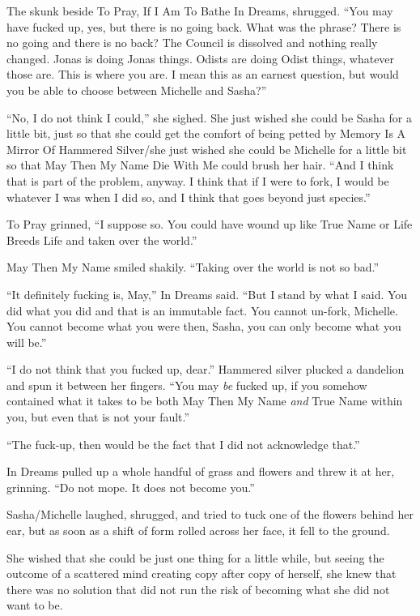 The skunk beside To Pray, If I Am To Bathe In Dreams, shrugged. ``You may have fucked up, yes, but there is no going back. What was the phrase? There is no going and there is no back? The Council is dissolved and nothing really changed. Jonas is doing Jonas things. Odists are doing Odist things, whatever those are. This is where you are. I mean this as an earnest question, but would you be able to choose between Michelle and Sasha?''

``No, I do not think I could,'' she sighed. She just wished she could be Sasha for a little bit, just so that she could get the comfort of being petted by Memory Is A Mirror Of Hammered Silver/she just wished she could be Michelle for a little bit so that May Then My Name Die With Me could brush her hair. ``And I think that is part of the problem, anyway. I think that if I were to fork, I would be whatever I was when I did so, and I think that goes beyond just species.''

To Pray grinned, ``I suppose so. You could have wound up like True Name or Life Breeds Life and taken over the world.''

May Then My Name smiled shakily. ``Taking over the world is not so bad.''

``It definitely fucking is, May,'' In Dreams said. ``But I stand by what I said. You did what you did and that is an immutable fact. You cannot un-fork, Michelle. You cannot become what you were then, Sasha, you can only become what you will be.''

``I do not think that you fucked up, dear.'' Hammered silver plucked a dandelion and spun it between her fingers. ``You may \emph{be} fucked up, if you somehow contained what it takes to be both May Then My Name \emph{and} True Name within you, but even that is not your fault.''

``The fuck-up, then would be the fact that I did not acknowledge that.''

In Dreams pulled up a whole handful of grass and flowers and threw it at her, grinning. ``Do not mope. It does not become you.''

Sasha/Michelle laughed, shrugged, and tried to tuck one of the flowers behind her ear, but as soon as a shift of form rolled across her face, it fell to the ground.

She wished that she could be just one thing for a little while, but seeing the outcome of a scattered mind creating copy after copy of herself, she knew that there was no solution that did not run the risk of becoming what she did not want to be.

